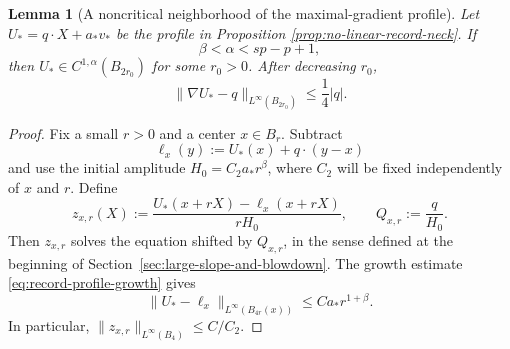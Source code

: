 \documentclass[11pt,reqno]{amsart}
\numberwithin{equation}{section}
\newtheorem{lemma}[theorem]{Lemma}
\theoremstyle{remark}
\begin{document}
\begin{lemma}[A noncritical neighborhood of the maximal-gradient profile]
\label{lem:record-noncritical-neighborhood}
Let \(U_*=q\cdot X+a_*v_*\) be the profile in Proposition
\ref{prop:no-linear-record-neck}.  If
\begin{equation*}
 \beta<\alpha<sp-p+1,
\end{equation*}
then \(U_*\in C^{1,\alpha}(B_{2r_0})\) for some \(r_0>0\).  After
decreasing \(r_0\),
\begin{equation}
 \|\nabla U_*-q\|_{L^\infty(B_{2r_0})}\le\frac14|q|.
 \label{eq:record-noncritical-gradient-tube}
\end{equation}
\end{lemma}

\begin{proof}
Fix a small \(r>0\) and a center \(x\in B_r\).  Subtract
\[
 \ell_x(y):=U_*(x)+q\cdot(y-x)
\]
and use the initial amplitude \(H_0=C_2a_*r^\beta\), where \(C_2\) will
be fixed independently of \(x\) and \(r\).  Define
\begin{equation*}
 z_{x,r}(X):=
 \frac{U_*(x+rX)-\ell_x(x+rX)}{rH_0},
 \qquad Q_{x,r}:=\frac q{H_0}.
\end{equation*}
Then \(z_{x,r}\) solves the equation shifted by \(Q_{x,r}\), in the
sense defined at the beginning of
Section~\ref{sec:large-slope-and-blowdown}.  The growth estimate
\eqref{eq:record-profile-growth} gives
\begin{equation}
 \|U_*-\ell_x\|_{L^\infty(B_{4r}(x))}
 \le C a_*r^{1+\beta}.
 \label{eq:record-translated-affine-tube}
\end{equation}
In particular, \(\|z_{x,r}\|_{L^\infty(B_4)}\le C/C_2\).


\end{proof}
\end{document}
